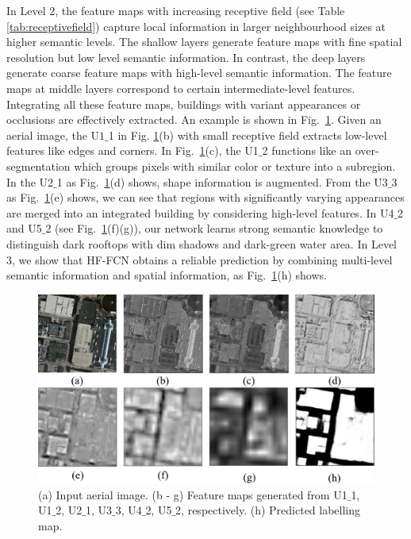    In Level 2, the feature maps with increasing receptive field (see Table \ref{tab:receptivefield}) capture local information in larger neighbourhood sizes at higher semantic levels. The shallow layers generate feature maps with fine spatial resolution but low level semantic information. In contrast, the deep layers generate coarse feature maps with high-level semantic information. The feature maps at middle layers correspond to certain intermediate-level features. Integrating all these feature maps, buildings with variant appearances or occlusions are effectively extracted.
  An example is shown in Fig.~\ref{fig:featuremapsofHF-FCN}. Given an aerial image, the U$1\_$1 in Fig. \ref{fig:featuremapsofHF-FCN}(b) with small receptive field extracts low-level features like edges and corners. In Fig.~\ref{fig:featuremapsofHF-FCN}(c), the U1$\_$2 functions like an over-segmentation which groups pixels with similar color or texture into a subregion. 
  In the U2$\_$1 as Fig.~\ref{fig:featuremapsofHF-FCN}(d) shows, shape information is augmented. 
  From the U3$\_$3 as Fig.~\ref{fig:featuremapsofHF-FCN}(e) shows, we can see that regions with significantly varying appearances are merged into an integrated building by considering high-level features. In U4$\_$2 and U5$\_$2 (see Fig.~\ref{fig:featuremapsofHF-FCN}(f)(g)), our network learns strong semantic knowledge to distinguish dark rooftops with dim shadows and dark-green water area. In Level 3, we show that HF-FCN obtains a reliable prediction by combining multi-level semantic information and spatial information, as Fig.~\ref{fig:featuremapsofHF-FCN}(h) shows. 

\begin{figure}
\centering
\includegraphics[width=120mm]{figs/featuremaps}
\caption{(a) Input aerial image. (b - g) Feature maps generated from U1$\_$1, U1$\_$2, U2$\_$1, U3$\_$3, U4$\_$2, U5$\_$2, respectively. (h) Predicted labelling map.}
\label{fig:featuremapsofHF-FCN}
\end{figure}

